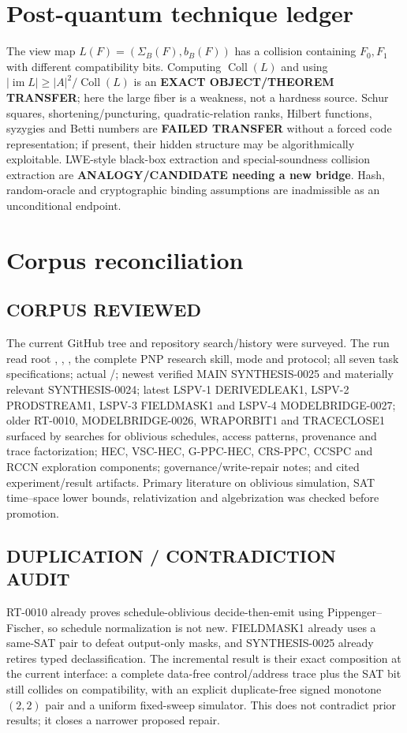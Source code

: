 \documentclass[11pt]{article}
\begin{document}
\section{Post-quantum technique ledger}
The view map $L(F)=(\Sigma_B(F),b_B(F))$ has a collision containing
$F_0,F_1$ with different compatibility bits.  Computing
$\operatorname{Coll}(L)$ and using
$|\operatorname{im}L|\ge |A|^2/\operatorname{Coll}(L)$ is an
\textbf{EXACT OBJECT/THEOREM TRANSFER}; here the large fiber is a weakness, not
a hardness source.  Schur squares, shortening/puncturing, quadratic-relation
ranks, Hilbert functions, syzygies and Betti numbers are
\textbf{FAILED TRANSFER} without a forced code representation; if present,
their hidden structure may be algorithmically exploitable.  LWE-style
black-box extraction and special-soundness collision extraction are
\textbf{ANALOGY/CANDIDATE needing a new bridge}.  Hash, random-oracle and
cryptographic binding assumptions are inadmissible as an unconditional
endpoint.

\section{Corpus reconciliation}
\subsection*{CORPUS REVIEWED}
The current GitHub tree and repository search/history were surveyed.  The run
read root , , , the complete
PNP research skill, mode and protocol; all seven task specifications; actual
/; newest verified MAIN SYNTHESIS-0025 and
materially relevant SYNTHESIS-0024; latest LSPV-1 DERIVEDLEAK1, LSPV-2
PRODSTREAM1, LSPV-3 FIELDMASK1 and LSPV-4 MODELBRIDGE-0027; older RT-0010,
MODELBRIDGE-0026, WRAPORBIT1 and TRACECLOSE1 surfaced by searches for
oblivious schedules, access patterns, provenance and trace factorization; HEC,
VSC-HEC, G-PPC-HEC, CRS-PPC, CCSPC and RCCN exploration components;
governance/write-repair notes; and cited experiment/result artifacts.  Primary
literature on oblivious simulation, SAT time--space lower bounds,
relativization and algebrization was checked before promotion.

\subsection*{DUPLICATION / CONTRADICTION AUDIT}
RT-0010 already proves schedule-oblivious decide-then-emit using
Pippenger--Fischer, so schedule normalization is not new.  FIELDMASK1 already
uses a same-SAT pair to defeat output-only masks, and SYNTHESIS-0025 already
retires typed declassification.  The incremental result is their exact
composition at the current interface: a complete data-free control/address
trace plus the SAT bit still collides on compatibility, with an explicit
duplicate-free signed monotone $(2,2)$ pair and a uniform fixed-sweep simulator.
This does not contradict prior results; it closes a narrower proposed repair.
\end{document}
